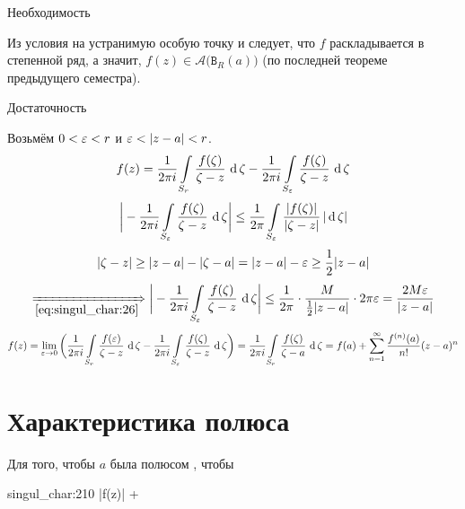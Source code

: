 \begin{eproof}
	\item Необходимость

	Из условия на устранимую особую точку и  следует, что $ f $ раскладывается в степенной ряд, а значит, $ f(z) \in \mathcal A \bigl( \mathtt B_R(a) \bigr) $ (по последней теореме предыдущего семестра).
	\item Достаточность

	Возьмём $ 0 < \eps < r $ и $ \eps < |z - a| < r $.
	$$ f(z) = \frac1{2\pi i} \cint[\zeta]{S_r}{\frac{f(\zeta)}{\zeta - z}} - \frac1{2\pi i}\cint[\zeta]{S_\eps}{\frac{f(\zeta)}{\zeta - z}} $$
	$$ \bigg| -\frac1{2\pi i} \cint[\zeta]{S_\eps}{\frac{f(\zeta)}{\zeta - z}} \bigg| \le \frac1{2\pi} \acint[\zeta]{S_\eps}{\frac{|f(\zeta)|}{|\zeta - z|}} $$
	$$ |\zeta - z| \ge |z - a| - |\zeta - a| = |z - a| - \eps \ge \frac12|z - a| $$
	$$ \underimp{\eref{singul_char:26}} \bigg| -\frac1{2\pi i} \cint[\zeta]{S_\eps}{\frac{f(\zeta)}{\zeta - z}} \bigg| \le \frac1{2\pi} \cdot \frac M{\frac12 |z - a|} \cdot 2\pi \eps = \frac{2 M \eps}{|z - a|} $$
	$$ f(z) = \liml{\eps \to 0} \bigg( \frac1{2\pi i} \cint[\zeta]{S_r}{\frac{f(\eps)}{\zeta - z}} - \frac1{2\pi i} \cint[\zeta]{S_\eps}{\frac{f(\zeta)}{\zeta - z}} \bigg) = \frac1{2\pi i} \cint[\zeta]{S_r}{\frac{f(\zeta)}{\zeta - a}} = f(a) + \sum_{n = 1}^\infty \frac{\nder f(a)}{n!} (z - a)^n $$
\end{eproof}

\section{Характеристика полюса}

\begin{theorem}
	Для того, чтобы $ a $ была полюсом , чтобы
	\begin{equ}{singul_char:210}
		|f(z)|  +\infty
	\end{equ}
\end{theorem}

